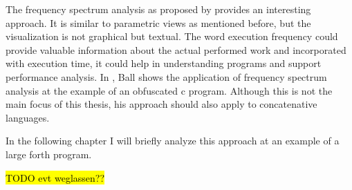 The frequency spectrum analysis as proposed by \cite{Ball:1999:CDA:318774.318944} provides an interesting approach. It is similar to parametric views as mentioned before, but the visualization is not graphical but textual. The word execution frequency could provide valuable information about the actual performed work and incorporated with execution time, it could help in understanding programs and support performance analysis. In \cite{Ball:1999:CDA:318774.318944}, Ball shows the application of frequency spectrum analysis at the example of an obfuscated c program. Although this is not the main focus of this thesis, his approach should also apply to concatenative languages.

In the following chapter I will briefly analyze this approach at an example of a large forth program.

\hl{TODO evt weglassen??}


